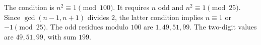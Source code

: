 The condition is $n^2\equiv1\pmod{100}$. It requires $n$ odd and $n^2\equiv1\pmod{25}$. Since $\gcd(n-1,n+1)$ divides $2$, the latter condition implies $n\equiv1$ or $-1\pmod{25}$. The odd residues modulo $100$ are $1,49,51,99$. The two-digit values are $49,51,99$, with sum $\boxed{199}$.
